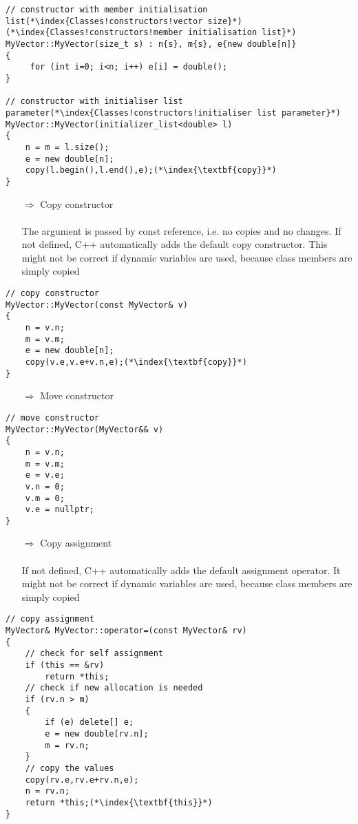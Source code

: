 \documentclass[10pt]{article}
\begin{document}
\begin{lstlisting}
// constructor with member initialisation list(*\index{Classes!constructors!vector size}*)(*\index{Classes!constructors!member initialisation list}*)
MyVector::MyVector(size_t s) : n{s}, m{s}, e{new double[n]}
{
     for (int i=0; i<n; i++) e[i] = double();
}

// constructor with initialiser list parameter(*\index{Classes!constructors!initialiser list parameter}*)
MyVector::MyVector(initializer_list<double> l)
{
    n = m = l.size();
    e = new double[n];
    copy(l.begin(),l.end(),e);(*\index{\textbf{copy}}*)
}
\end{lstlisting}
\begin{enumerate}
\item[$\Rightarrow$] Copy constructor\\ \\ The argument is passed by const reference, i.e. no copies and no changes. If not defined, C++ automatically adds the default copy
constructor. This might not be correct if dynamic variables are used,
because class members are simply copied
\end{enumerate}
\begin{lstlisting}
// copy constructor
MyVector::MyVector(const MyVector& v)
{
    n = v.n;
    m = v.m;
    e = new double[n];
    copy(v.e,v.e+v.n,e);(*\index{\textbf{copy}}*)
}
\end{lstlisting}
\begin{enumerate}
\item[$\Rightarrow$] Move constructor
\end{enumerate}
\begin{lstlisting}
// move constructor
MyVector::MyVector(MyVector&& v)
{
    n = v.n;
    m = v.m;
    e = v.e;
    v.n = 0;
    v.m = 0;
    v.e = nullptr;
}
\end{lstlisting}
\begin{enumerate}
\item[$\Rightarrow$] Copy assignment\\ \\ If not defined, C++ automatically adds  the default assignment operator.
It might not be correct if dynamic variables are used,
because class members are simply copied
\end{enumerate}
\begin{lstlisting}
// copy assignment
MyVector& MyVector::operator=(const MyVector& rv)
{
    // check for self assignment
    if (this == &rv)
        return *this;
    // check if new allocation is needed
    if (rv.n > m)
    {
        if (e) delete[] e;
        e = new double[rv.n];
        m = rv.n;
    }
    // copy the values
    copy(rv.e,rv.e+rv.n,e);
    n = rv.n;
    return *this;(*\index{\textbf{this}}*)
}
\end{lstlisting}
\end{document}
